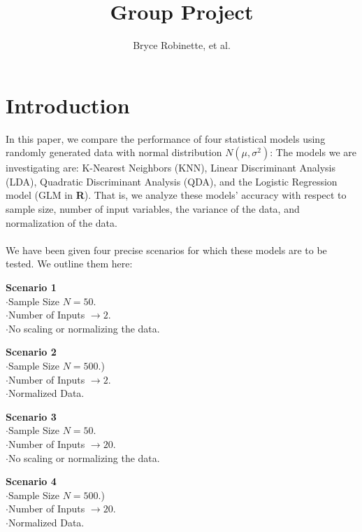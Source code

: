 \documentclass[11pt, oneside]{article}
\title{Group Project}
\author{Bryce Robinette, et al.}
\date{}
\begin{document}
\maketitle




\section*{Introduction}
In this paper, we compare the performance of four statistical models using randomly generated data with normal distribution $N(\mu, \sigma^2)$: The models we are investigating are: K-Nearest Neighbors (KNN), Linear Discriminant Analysis (LDA), Quadratic Discriminant Analysis (QDA), and the Logistic Regression model (GLM in \textbf\textsf{R}). That is, we analyze these models' accuracy with respect to sample size, number of input variables, the variance of the data, and normalization of the data.\\
\\
We have been given four precise scenarios for which these models are to be tested. We outline them here:\\


\hspace{1.5cm}\parbox[t][2.5cm][t]{8cm}{
	\textbf{Scenario 1}\\
	$\cdot$Sample Size $N = 50.$\\
	$\cdot$Number of Inputs $\rightarrow 2$.\\
	$\cdot$No scaling or normalizing the data.
}
\parbox[t][2.5cm][t]{8cm}{
	\textbf{Scenario 2}\\
	$\cdot$Sample Size $N = 500.$)\\
	$\cdot$Number of Inputs $\rightarrow 2$.\\
	$\cdot$Normalized Data.
}

\hspace{1.5cm}\parbox[t][2.5cm][t]{8cm}{
	\textbf{Scenario 3}\\
	$\cdot$Sample Size $N = 50.$\\
	$\cdot$Number of Inputs $\rightarrow 20$.\\
	$\cdot$No scaling or normalizing the data.
}
\parbox[t][2.5cm][t]{8cm}{
	\textbf{Scenario 4}\\
	$\cdot$Sample Size $N = 500.$)\\
	$\cdot$Number of Inputs $\rightarrow 20$.\\
	$\cdot$Normalized Data.
}
\end{document}
